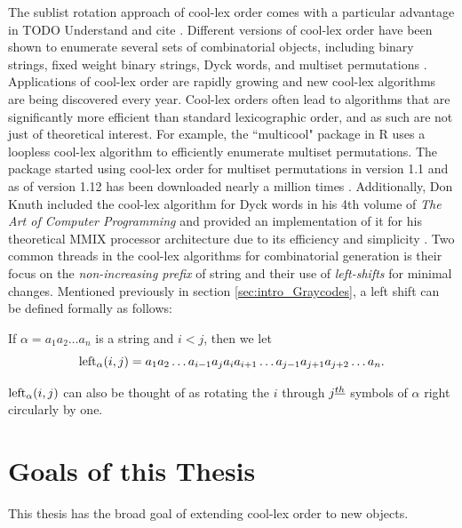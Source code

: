 The sublist rotation approach of cool-lex order comes with a particular advantage in TODO Understand and cite \cite{ruskey2012binary}. Different versions of cool-lex order have been shown to enumerate several sets of combinatorial objects, including binary strings, fixed weight binary strings, Dyck words, and multiset permutations \cite{williams2009shift}.  Applications of cool-lex order are rapidly growing and new cool-lex algorithms are being discovered every year.  Cool-lex orders often lead to algorithms that are significantly more efficient than standard lexicographic order, and as such are not just of theoretical interest.  For example, the ``multicool" package in R uses a loopless cool-lex algorithm to efficiently enumerate multiset permutations.   The package started using cool-lex order for multiset permutations in version 1.1 and as of version 1.12 has been downloaded nearly a million times \cite{multicool_2021}.  Additionally, Don Knuth included the cool-lex algorithm for Dyck words in his 4th volume of \emph{The Art of Computer Programming} and provided an implementation of it for his theoretical MMIX processor architecture due to its efficiency and simplicity \cite{knuth2015art}.
Two common threads in the cool-lex algorithms for combinatorial generation is their focus on the \emph{non-increasing prefix} of string and their use of \emph{left-shifts} for minimal changes.  Mentioned previously in section \ref{sec:intro_Graycodes}, a left shift can be defined formally as follows:

If $\alpha = a_1 a_2 \ldots a_n$ is a string and $i < j$, then we let
\begin{equation}
    \lshiftindex[\alpha]{i}{j} = a_1 a_2 \ldots a_{i-1} a_j a_{i} a_{i+1} \ldots a_{j-1} a_{j+1} a_{j+2} \ldots a_n. \label{eq:leftdef}
\end{equation}

$\lshiftindex[\alpha]{i}{j}$ can also be thought of as rotating the $i$ through $j\thh$ symbols of $\alpha$ right circularly by one.




\section{Goals of this Thesis}


This thesis has the broad goal of extending cool-lex order to new objects.

